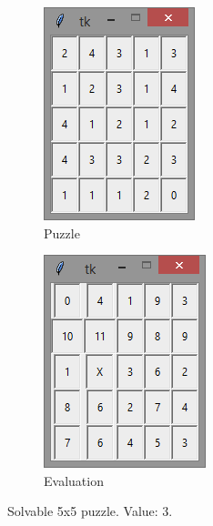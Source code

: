 \documentclass[12pt]{article}
\begin{document}
\begin{figure}[H]
	\begin{subfigure}{.5\textwidth}
		\centering
     		\includegraphics[width = .6\linewidth]{5x5_puzzle_3}
     		\caption{Puzzle}
     		\label{fig2:sfig1}
	\end{subfigure}
	\begin{subfigure}{.5\textwidth}
		\centering
		\includegraphics[width = .6\linewidth]{5x5_eval_3}
		\caption{Evaluation}
		\label{fig2:sfig2}
	\end{subfigure}
\caption{Solvable 5x5 puzzle. Value: 3.}
\label{fig:5x5good}
\end{figure}
\end{document}
